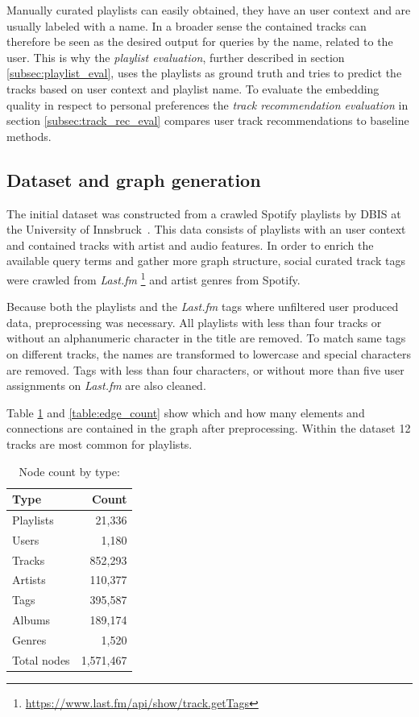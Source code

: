 \documentclass[sigconf]{acmart}
\begin{document}
Manually curated playlists can easily obtained, they have an user context and are usually labeled with a name. In a broader sense the contained tracks can therefore be seen as the desired output for queries by the name, related to the user. This is why the \emph{playlist evaluation}, further described in section \ref{subsec:playlist_eval}, uses the playlists as ground truth and tries to predict the tracks based on user context and playlist name. To evaluate the embedding quality in respect to personal preferences the \emph{track recommendation evaluation} in section \ref{subsec:track_rec_eval} compares user track recommendations to baseline methods.


\subsection{Dataset and graph generation}
The initial dataset was constructed from a crawled Spotify playlists by DBIS at the University of Innsbruck~\cite{pichl2017improving}. This data consists of playlists with an user context and contained tracks with artist and audio features. In order to enrich the available query terms and gather more graph structure, social curated track tags were crawled from \emph{Last.fm} \footnote{\url{https://www.last.fm/api/show/track.getTags}} and artist genres from Spotify.

Because both the playlists and the \emph{Last.fm} tags where unfiltered user produced data, preprocessing was necessary. All playlists with less than four tracks or without an alphanumeric character in the title are removed. To match same tags on different tracks, the names are transformed to lowercase and special characters are removed. Tags with less than four characters, or without more than five user assignments on \emph{Last.fm} are also cleaned.

Table \ref{table:node_count} and \ref{table:edge_count} show which and how many elements and connections are contained in the graph after preprocessing. Within the dataset 12 tracks are most common for playlists.

\begin{table}[H]
	\caption{Node count by type:}
	\label{table:node_count}
	\begin{tabular}{lr}
		\midrule 
		\textbf{Type} & \textbf{Count} \\ 
		\midrule 
		Playlists & 21,336  \\
		Users     & 1,180     \\
		Tracks    & 852,293 \\
		Artists   & 110,377  \\
		Tags      & 395,587    \\
		Albums    & 189,174    \\
		Genres	  & 1,520	\\
		\midrule 
		Total nodes & 1,571,467\\
		\bottomrule
	\end{tabular}
\end{table}
\end{document}
